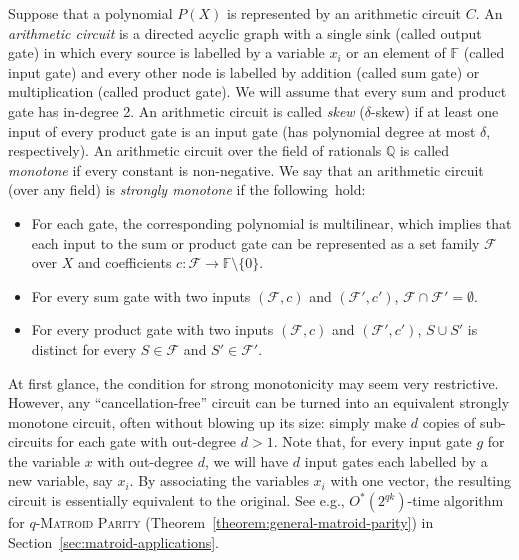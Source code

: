 \documentclass[10pt,a4paper]{article}
\newcommand{\F}{\ensuremath{\mathbb F}\xspace}
\newcommand{\Q}{\ensuremath{\mathbb Q}\xspace}
\newcommand{\cF}{\ensuremath{\mathcal F}\xspace}
\begin{document}
Suppose that a polynomial $P(X)$ is represented by an arithmetic circuit $C$.
An \emph{arithmetic circuit} is a directed acyclic graph with a single sink (called output gate) in which every source is labelled by a variable $x_i$ or an element of $\F$ (called input gate) and every other node is labelled by addition (called sum gate) or multiplication (called product gate).
We will assume that every sum and product gate has in-degree 2.
An arithmetic circuit is called \emph{skew} ($\delta$-skew) if at least one input of every product gate is an input gate (has polynomial degree at most $\delta$, respectively).
An arithmetic circuit over the field of rationals $\Q$ is called \emph{monotone} if every constant is non-negative.
We say that an arithmetic circuit (over any field) is \emph{strongly monotone} if the following~hold:
\begin{itemize}
  \item For each gate, the corresponding polynomial is multilinear, which implies that each input to the sum or product gate can be represented as a set family $\cF$ over $X$ and coefficients $c \colon \cF \to \F \setminus \{ 0 \}$.
  \item For every sum gate with two inputs $(\cF, c)$ and $(\cF', c')$, $\cF \cap \cF' = \emptyset$.
  \item For every product gate with two inputs $(\cF, c)$ and $(\cF', c')$, $S \cup S'$ is distinct for every $S \in \cF$ and $S' \in \cF'$.
\end{itemize}
At first glance, the condition for strong monotonicity may seem very restrictive.
However, any ``cancellation-free'' circuit can be turned into an equivalent strongly monotone circuit, often without blowing up its size: simply make $d$ copies of sub-circuits for each gate with out-degree $d > 1$.
Note that, for every input gate $g$ for the variable $x$ with out-degree $d$, we will have $d$ input gates each labelled by a new variable, say $x_i$.
By associating the variables $x_i$ with one vector, the resulting circuit is essentially equivalent to the original.
See e.g., $O^*(2^{qk})$-time algorithm for \textsc{$q$-Matroid Parity} (Theorem~\ref{theorem:general-matroid-parity}) in Section~\ref{sec:matroid-applications}.
\end{document}
